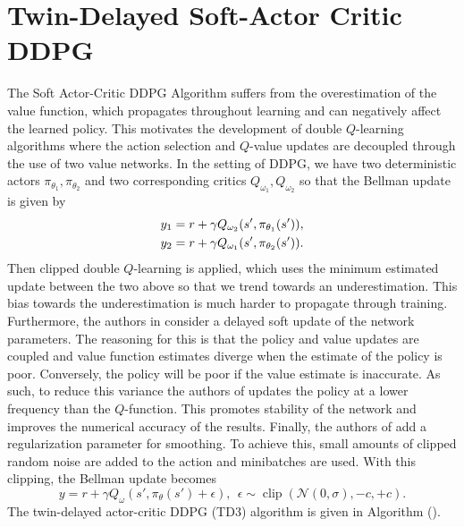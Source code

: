 \documentclass[10pt,conference]{IEEEtran}
\DeclareMathOperator{\Clip}{clip}
\begin{document}
\section{Twin-Delayed Soft-Actor Critic DDPG}
The Soft Actor-Critic DDPG Algorithm suffers from the overestimation of the value function, which propagates throughout learning and can negatively affect the learned policy. This motivates the development of double $Q$-learning algorithms where the action selection and $Q$-value updates are decoupled through the use of two value networks. In the setting of DDPG, we have two deterministic actors $\pi_{\theta_1}, \pi_{\theta_2}$ and two corresponding critics $Q_{\omega_1}, Q_{\omega_2}$ so that the Bellman update is given by 
\begin{align*}
	\displaystyle &y_1 = r + \gamma Q_{\omega_2}(s', \pi_{\theta_1}(s')), \\
	&y_2 = r + \gamma Q_{\omega_1}(s', \pi_{\theta_2}(s')).
\end{align*}
Then clipped double $Q$-learning is applied, which uses the minimum estimated update between the two above so that we trend towards an underestimation. This bias towards the underestimation is much harder to propagate through training. Furthermore, the authors in \cite{fujimoto2018addressing} consider a delayed soft update of the network parameters. The reasoning for this is that the policy and value updates are coupled and value function estimates diverge when the estimate of the policy is poor. Conversely, the policy will be poor if the value estimate is inaccurate. As such, to reduce this variance the authors of \cite{fujimoto2018addressing} updates the policy at a lower frequency than the $Q$-function. This promotes stability of the network and improves the numerical accuracy of the results. Finally, the authors of \cite{fujimoto2018addressing} add a regularization parameter for smoothing. To achieve this, small amounts of clipped random noise are added to the action and minibatches are used. With this clipping, the Bellman update becomes 
\begin{equation*}
	\displaystyle y = r + \gamma Q_\omega(s', \pi_{\theta}(s') + \epsilon), \:\: \epsilon \sim \Clip(\mathcal{N}(0, \sigma), -c, +c).
\end{equation*}
The twin-delayed actor-critic DDPG (TD3) algorithm is given in Algorithm ().
\end{document}

